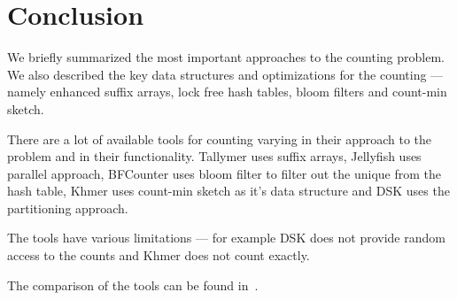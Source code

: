 \section{Conclusion}

We briefly summarized the most important approaches to the \kmer counting problem. We also described the key data structures and optimizations for the \kmer counting --- namely enhanced suffix arrays, lock free hash tables, bloom filters and count-min sketch.

There are a lot of available tools for \kmer counting varying in their approach to the problem and in their functionality. Tallymer uses suffix arrays, Jellyfish uses parallel approach, BFCounter uses bloom filter to filter out the unique \kmers from the hash table, Khmer uses count-min sketch as it's data structure and DSK uses the partitioning approach.

The tools have various limitations --- for example DSK does not provide random access to the counts and Khmer does not count \kmers exactly.

The comparison of the tools can be found in~\cite{khmer}.
